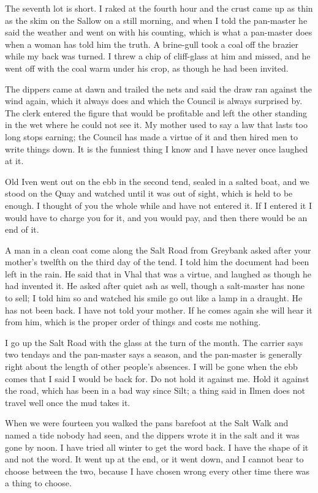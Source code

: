 \documentclass{design/chronicle}
\begin{document}
The seventh lot is short. I raked at the fourth hour and the crust came up as thin as the skim on the Sallow on a still morning, and when I told the pan-master he said the weather and went on with his counting, which is what a pan-master does when a woman has told him the truth. A brine-gull took a coal off the brazier while my back was turned. I threw a chip of cliff-glass at him and missed, and he went off with the coal warm under his crop, as though he had been invited.

The dippers came at dawn and trailed the nets and said the draw ran against the wind again, which it always does and which the Council is always surprised by. The clerk entered the figure that would be profitable and left the other standing in the wet where he could not see it. My mother used to say a law that lasts too long stops earning; the Council has made a virtue of it and then hired men to write things down. It is the funniest thing I know and I have never once laughed at it.

Old Iven went out on the ebb in the second tend, sealed in a salted boat, and we stood on the Quay and watched until it was out of sight, which is held to be enough. I thought of you the whole while and have not entered it. If I entered it I would have to charge you for it, and you would pay, and then there would be an end of it.

A man in a clean coat come along the Salt Road from Greybank asked after your mother’s twelfth on the third day of the tend. I told him the document had been left in the rain. He said that in Vhal that was a virtue, and laughed as though he had invented it. He asked after quiet ash as well, though a salt-master has none to sell; I told him so and watched his smile go out like a lamp in a draught. He has not been back. I have not told your mother. If he comes again she will hear it from him, which is the proper order of things and costs me nothing.

I go up the Salt Road with the glass at the turn of the month. The carrier says two tendays and the pan-master says a season, and the pan-master is generally right about the length of other people’s absences. I will be gone when the ebb comes that I said I would be back for. Do not hold it against me. Hold it against the road, which has been in a bad way since Silt; a thing said in Ilmen does not travel well once the mud takes it.

When we were fourteen you walked the pans barefoot at the Salt Walk and named a tide nobody had seen, and the dippers wrote it in the salt and it was gone by noon. I have tried all winter to get the word back. I have the shape of it and not the word. It went up at the end, or it went down, and I cannot bear to choose between the two, because I have chosen wrong every other time there was a thing to choose.
\end{document}
